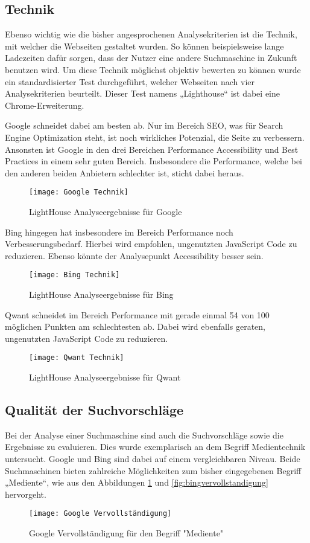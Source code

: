 \subsection{Technik}
Ebenso wichtig wie die bisher angesprochenen Analysekriterien ist die Technik, mit welcher die Webseiten gestaltet wurden.
So können beispielsweise lange Ladezeiten dafür sorgen, dass der Nutzer eine andere Suchmaschine in Zukunft benutzen wird.
Um diese Technik möglichst objektiv bewerten zu können wurde ein standardisierter Test durchgeführt, welcher Webseiten nach
vier Analysekriterien beurteilt. Dieser Test namens „Lighthouse“ ist dabei eine Chrome-Erweiterung.

Google schneidet dabei am besten ab. Nur im Bereich SEO, was für Search Engine Optimization steht, ist noch wirkliches
Potenzial, die Seite zu verbessern. Ansonsten ist Google in den drei Bereichen Performance Accessibility und Best Practices
in einem sehr guten Bereich. Insbesondere die Performance, welche bei den anderen beiden Anbietern schlechter ist,
sticht dabei heraus.
\begin{figure}[h]
    \centering
    \texttt{[image: Google Technik]}
    \caption{LightHouse Analyseergebnisse für Google}
\end{figure}

Bing hingegen hat insbesondere im Bereich Performance noch Verbesserungsbedarf. Hierbei wird empfohlen, ungenutzten JavaScript
Code zu reduzieren. Ebenso könnte der Analysepunkt Accessibility besser sein.
\begin{figure}[h]
    \centering
    \texttt{[image: Bing Technik]}
    \caption{LightHouse Analyseergebnisse für Bing}
\end{figure}

Qwant schneidet im Bereich Performance mit gerade einmal 54 von 100 möglichen Punkten am schlechtesten ab. Dabei wird ebenfalls
geraten, ungenutzten JavaScript Code zu reduzieren.
\begin{figure}[h]
    \centering
    \texttt{[image: Qwant Technik]}
    \caption{LightHouse Analyseergebnisse für Qwant}
\end{figure}

\subsection{Qualität der Suchvorschläge}
Bei der Analyse einer Suchmaschine sind auch die Suchvorschläge sowie die Ergebnisse zu evaluieren. Dies wurde exemplarisch
an dem Begriff Medientechnik untersucht. Google und Bing sind dabei auf einem vergleichbaren Niveau. Beide Suchmaschinen
bieten zahlreiche Möglichkeiten zum bisher eingegebenen Begriff „Mediente“, wie aus den Abbildungen \ref{fig:googlevervollstandigung} und \ref{fig:bingvervollstandigung} hervorgeht.
\begin{figure}[h]
    \centering
    \texttt{[image: Google Vervollständigung]}
    \caption{Google Vervollständigung für den Begriff "Mediente"}
    \label{fig:googlevervollstandigung}
\end{figure}

